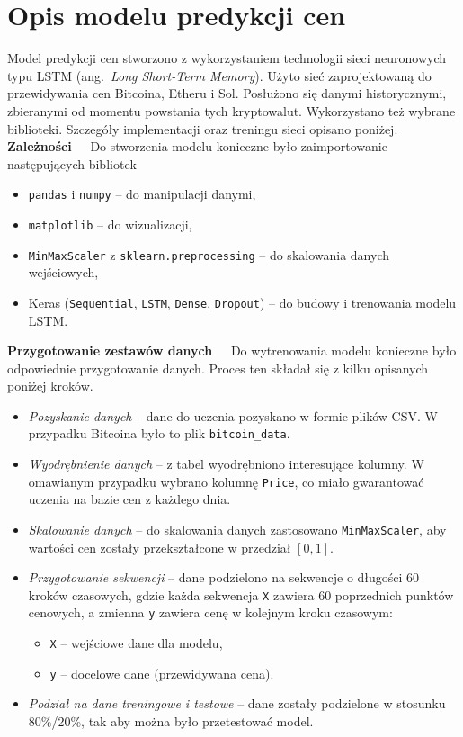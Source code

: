 \section{Opis modelu predykcji cen}
Model predykcji cen stworzono z wykorzystaniem technologii sieci neuronowych typu LSTM (ang.~\emph{Long Short-Term Memory}). Użyto sieć zaprojektowaną do przewidywania cen Bitcoina, Etheru i Sol. Posłużono się danymi historycznymi, zbieranymi od momentu powstania tych kryptowalut. Wykorzystano też wybrane biblioteki. Szczegóły implementacji oraz treningu sieci opisano poniżej.\\[-10pt]

\noindent \textbf{Zależności~~}
Do stworzenia modelu konieczne było zaimportowanie następujących bibliotek
\begin{itemize}
    \item \texttt{pandas} i \texttt{numpy} -- do manipulacji danymi,
    \item \texttt{matplotlib} -- do wizualizacji,
    \item \texttt{MinMaxScaler} z \texttt{sklearn.preprocessing} -- do skalowania danych wejściowych,
    \item Keras (\texttt{Sequential}, \texttt{LSTM}, \texttt{Dense}, \texttt{Dropout}) -- do budowy i trenowania modelu LSTM.
\end{itemize}

\noindent \textbf{Przygotowanie zestawów danych~~}
Do wytrenowania modelu konieczne było odpowiednie przygotowanie danych. Proces ten składał się z kilku opisanych poniżej kroków.
\begin{itemize}
\item \emph{Pozyskanie danych} -- dane do uczenia pozyskano w formie plików CSV. W przypadku Bitcoina było to plik \texttt{bitcoin\_data}.
\item \emph{Wyodrębnienie danych} -- z tabel wyodrębniono interesujące kolumny. W omawianym przypadku wybrano kolumnę \texttt{Price}, co miało gwarantować uczenia na bazie cen z każdego dnia.
\item \emph{Skalowanie danych} -- do skalowania danych zastosowano \texttt{MinMaxScaler}, aby wartości cen zostały przekształcone w przedział \([0, 1]\).
\item \emph{Przygotowanie sekwencji} -- dane podzielono na sekwencje o długości 60 kroków czasowych, gdzie każda sekwencja \texttt{X} zawiera 60 poprzednich punktów cenowych, a zmienna \texttt{y} zawiera cenę w kolejnym kroku czasowym:
\begin{itemize}
    \item \texttt{X} – wejściowe dane dla modelu,
    \item \texttt{y} – docelowe dane (przewidywana cena).
\end{itemize}
\item \emph{Podział na dane treningowe i testowe} -- dane zostały podzielone w stosunku 80\%/20\%, tak aby można było przetestować model.
\end{itemize}


